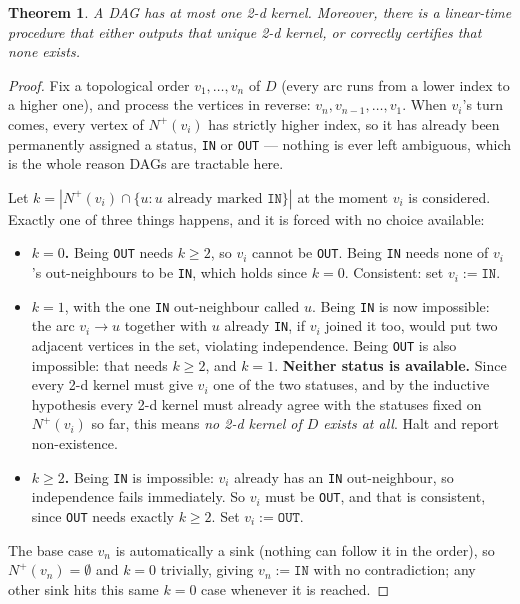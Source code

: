 \documentclass[11pt]{article}
\theoremstyle{plain}
\newtheorem{theorem}{Theorem}[section]
\theoremstyle{definition}
\theoremstyle{remark}
\begin{document}
\begin{theorem}
A DAG has at most one 2-d kernel. Moreover, there is a linear-time procedure that either
outputs that unique 2-d kernel, or correctly certifies that none exists.
\end{theorem}

\begin{proof}
Fix a topological order $v_1, \dots, v_n$ of $D$ (every arc runs from a lower index to
a higher one), and process the vertices in reverse: $v_n, v_{n-1}, \dots, v_1$. When
$v_i$'s turn comes, every vertex of $N^+(v_i)$ has strictly higher index, so it has
already been permanently assigned a status, \texttt{IN} or \texttt{OUT} — nothing is
ever left ambiguous, which is the whole reason DAGs are tractable here.

Let $k = |N^+(v_i) \cap \{u : u \text{ already marked } \texttt{IN}\}|$ at the moment
$v_i$ is considered. Exactly one of three things happens, and it is forced with no
choice available:
\begin{itemize}[nosep]
\item \textbf{$k = 0$.} Being \texttt{OUT} needs $k \ge 2$, so $v_i$ cannot be
\texttt{OUT}. Being \texttt{IN} needs none of $v_i$'s out-neighbours to be
\texttt{IN}, which holds since $k=0$. Consistent: set $v_i := \texttt{IN}$.
\item \textbf{$k = 1$}, with the one \texttt{IN} out-neighbour called $u$. Being
\texttt{IN} is now impossible: the arc $v_i \to u$ together with $u$ already
\texttt{IN}, if $v_i$ joined it too, would put two adjacent vertices in the set,
violating independence. Being \texttt{OUT} is also impossible: that needs $k \ge 2$,
and $k=1$. \textbf{Neither status is available.} Since every 2-d kernel must give
$v_i$ one of the two statuses, and by the inductive hypothesis every 2-d kernel must
already agree with the statuses fixed on $N^+(v_i)$ so far, this means \emph{no
2-d kernel of $D$ exists at all}. Halt and report non-existence.
\item \textbf{$k \ge 2$.} Being \texttt{IN} is impossible: $v_i$ already has an
\texttt{IN} out-neighbour, so independence fails immediately. So $v_i$ must be
\texttt{OUT}, and that is consistent, since \texttt{OUT} needs exactly $k \ge 2$.
Set $v_i := \texttt{OUT}$.
\end{itemize}

The base case $v_n$ is automatically a sink (nothing can follow it in the order), so
$N^+(v_n) = \emptyset$ and $k=0$ trivially, giving $v_n := \texttt{IN}$ with no
contradiction; any other sink hits this same $k=0$ case whenever it is reached.


\end{proof}
\end{document}
